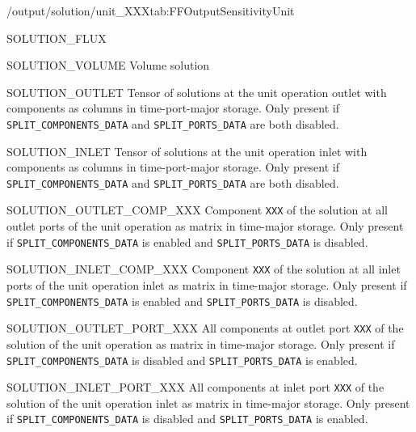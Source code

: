 \begin{groupscope}{/output/solution/unit\_XXX}{tab:FFOutputSensitivityUnit}
\begin{dataset}[type=double,unit={\si{\mol\per\square\metre\per\second}}]{SOLUTION\_FLUX}
  \end{dataset}
  \begin{dataset}[type=double,unit={\si{\cubic\metre}}]{SOLUTION\_VOLUME}
    Volume solution
  \end{dataset}
  \begin{dataset}[type=double,unit={\si{\mol\per\cubic\metre\of{IV}}}]{SOLUTION\_OUTLET}
    Tensor of solutions at the unit operation outlet with components as columns in time-port-major storage.
    Only present if \texttt{SPLIT\_COMPONENTS\_DATA} and \texttt{SPLIT\_PORTS\_DATA} are both disabled.
  \end{dataset}
  \begin{dataset}[type=double,unit={\si{\mol\per\cubic\metre\of{IV}}}]{SOLUTION\_INLET}
    Tensor of solutions at the unit operation inlet with components as columns in time-port-major storage.
    Only present if \texttt{SPLIT\_COMPONENTS\_DATA} and \texttt{SPLIT\_PORTS\_DATA} are both disabled.
  \end{dataset}
  \begin{dataset}[type=double,unit={\si{\mol\per\cubic\metre\of{IV}}}]{SOLUTION\_OUTLET\_COMP\_XXX}
    Component \texttt{XXX} of the solution at all outlet ports of the unit operation as matrix in time-major storage.
    Only present if \texttt{SPLIT\_COMPONENTS\_DATA} is enabled and \texttt{SPLIT\_PORTS\_DATA} is disabled.
  \end{dataset}
  \begin{dataset}[type=double,unit={\si{\mol\per\cubic\metre\of{IV}}}]{SOLUTION\_INLET\_COMP\_XXX}
    Component \texttt{XXX} of the solution at all inlet ports of the unit operation inlet as matrix in time-major storage.
    Only present if \texttt{SPLIT\_COMPONENTS\_DATA} is enabled and \texttt{SPLIT\_PORTS\_DATA} is disabled.
  \end{dataset}
  \begin{dataset}[type=double,unit={\si{\mol\per\cubic\metre\of{IV}}}]{SOLUTION\_OUTLET\_PORT\_XXX}
    All components at outlet port \texttt{XXX} of the solution of the unit operation as matrix in time-major storage.
    Only present if \texttt{SPLIT\_COMPONENTS\_DATA} is disabled and \texttt{SPLIT\_PORTS\_DATA} is enabled.
  \end{dataset}
  \begin{dataset}[type=double,unit={\si{\mol\per\cubic\metre\of{IV}}}]{SOLUTION\_INLET\_PORT\_XXX}
    All components at inlet port \texttt{XXX} of the solution of the unit operation inlet as matrix in time-major storage.
    Only present if \texttt{SPLIT\_COMPONENTS\_DATA} is disabled and \texttt{SPLIT\_PORTS\_DATA} is enabled.

\end{dataset}
\end{groupscope}
